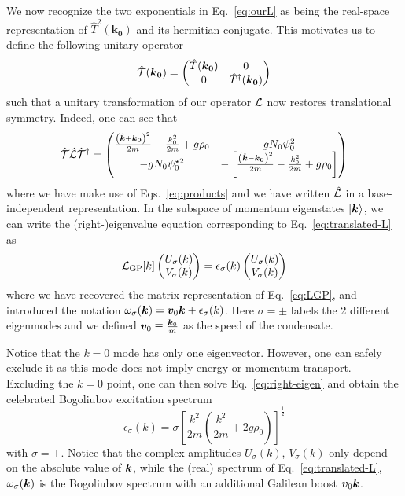 We now recognize the two exponentials in Eq.~\eqref{eq:ourL} as being
the real-space representation of $\hat{T}^2(\bm{k_0})$ and its
hermitian conjugate. This motivates us to define the following unitary
operator
%
\begin{equation}\label{eq:ucal}
  \hat{{\cal T}}(\bm{k_0}) = \begin{pmatrix} \hat{T}(\bm{k_0}) & 0\\ 0 & \hat{T}^{\dagger}(\bm{k_0}) \end{pmatrix}
\end{equation}
% 
such that a unitary transformation of our operator $\mathcal{L}$ now restores translational
symmetry. Indeed, one can see that
%
\begin{equation}\label{eq:translated-L}
  \hat{{\cal T}} \hat{\mathcal{L}} \hat{{\cal T}}^{\dagger} = \begin{pmatrix} \frac{\left(\hat{\bm{k}} + \bm{k_0}\right)^2}{2m} - \frac{k_0^2}{2m} + g\rho_0 & g N_0 \psi_0^2\\ - g N_0 \psi_0^{\star 2} & -\left[\frac{\left(\hat{\bm{k}} - \bm{k_0}\right)^2}{2m} - \frac{k_0^2}{2m} + g\rho_0 \right] \end{pmatrix}
\end{equation}
% 
where we have make use of Eqs.~\eqref{eq:products} and we have written
$\hat{\mathcal{L}}$ in a base-independent representation.  In the subspace of
momentum eigenstates $\vert \bm{k} \rangle$, we can write the (right-)eigenvalue
equation corresponding to Eq.~\eqref{eq:translated-L} as
%
\begin{equation}\label{eq:right-eigen}
  \mathcal{L}_{\text{GP}} [k] \begin{pmatrix} U_\sigma(k)\\ V_\sigma(k) \end{pmatrix} = \epsilon_\sigma(k) \begin{pmatrix} U_\sigma(k)\\ V_\sigma(k) \end{pmatrix}
\end{equation}
% 
where we have recovered the matrix representation of
Eq.~\eqref{eq:LGP}, and introduced the notation
$\omega_\sigma(\bm{k}) = \bm{v}_0 \bm{k} + \epsilon_\sigma(k)$. Here
$\sigma = \pm$ labels the 2 different eigenmodes and we defined
$\bm{v}_0 \equiv \frac{\bm{k}_0}{m}$ as the speed of the condensate.

Notice that the $k=0$ mode has only one eigenvector. However, one can
safely exclude it as this mode does not imply energy or momentum
transport. Excluding the $k = 0$ point, one can then solve
Eq.~\eqref{eq:right-eigen} and obtain the celebrated Bogoliubov
excitation spectrum
%
\begin{equation}\label{eq:bogoliubov}
  \epsilon_\sigma(k) = \sigma \left[\frac{k^2}{2m}\left(\frac{k^2}{2m} + 2 g \rho_0 \right) \right]^{\frac{1}{2}}
\end{equation}
% 
with $\sigma = \pm$. Notice that the complex amplitudes $U_\sigma(k)$,
$V_\sigma(k)$ only depend on the absolute value of $\bm{k}$, while the
(real) spectrum of Eq.~\eqref{eq:translated-L}, $\omega_\sigma(\bm{k})$
is the Bogoliubov spectrum with an additional Galilean boost
$\bm{v}_0 \bm{k}$.

